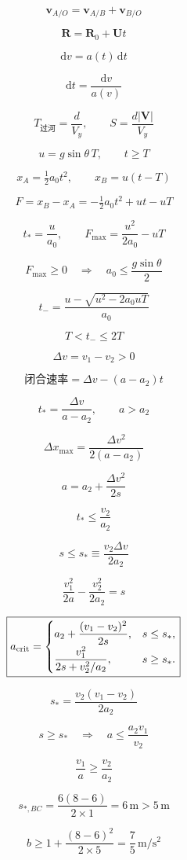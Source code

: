 \documentclass[12pt]{article}
\begin{document}
\[
\bm v_{A/O}=\bm v_{A/B}+\bm v_{B/O}
\]

\[
\bm R=\bm R_0+\bm Ut
\]

\[
\mathrm dv=a(t)\,\mathrm dt
\]

\[
\mathrm dt=\frac{\mathrm dv}{a(v)}
\]

\[
T_{\text{过河}}=\frac d{V_y},\qquad S=\frac{d|\bm V|}{V_y}
\]

\[
u=g\sin\theta\,T,\qquad t\ge T
\]

\[
x_A=\tfrac12a_0t^2,\qquad x_B=u(t-T)
\]

\[
F=x_B-x_A=-\tfrac12a_0t^2+ut-uT
\]

\[
t_*=\frac u{a_0},\qquad F_{\max}=\frac{u^2}{2a_0}-uT
\]

\[
F_{\max}\ge0\quad\Longrightarrow\quad\boxed{a_0\le\frac{g\sin\theta}{2}}
\]

\[
t_-=\frac{u-\sqrt{u^2-2a_0uT}}{a_0}
\]

\[
T<t_-\le2T
\]

\[
\Delta v=v_1-v_2>0
\]

\[
\text{闭合速率}=\Delta v-(a-a_2)t
\]

\[
t_*=\frac{\Delta v}{a-a_2},\qquad a>a_2
\]

\[
\Delta x_{\max}=\frac{\Delta v^2}{2(a-a_2)}
\]

\[
\boxed{a=a_2+\frac{\Delta v^2}{2s}}
\]

\[
t_*\le\frac{v_2}{a_2}
\]

\[
\boxed{s\le s_*\equiv\frac{v_2\Delta v}{2a_2}}
\]

\[
\frac{v_1^2}{2a}-\frac{v_2^2}{2a_2}=s
\]

\[
\boxed{a_{\rm crit}=\begin{cases}a_2+\dfrac{(v_1-v_2)^2}{2s},&s\le s_*,\\[4pt]\dfrac{v_1^2}{2s+v_2^2/a_2},&s\ge s_*.\end{cases}}
\]

\[
s_* =\frac{v_2(v_1-v_2)}{2a_2}
\]

\[
s\ge s_*\quad\Longrightarrow\quad a\le\frac{a_2v_1}{v_2}
\]

\[
\frac{v_1}{a}\ge\frac{v_2}{a_2}
\]

\[
s_{*,BC}=\frac{6(8-6)}{2\times1}=6\,\mathrm m>5\,\mathrm m
\]

\[
\boxed{b\ge1+\frac{(8-6)^2}{2\times5}=\frac75\,\mathrm{m/s^2}}
\]
\end{document}
